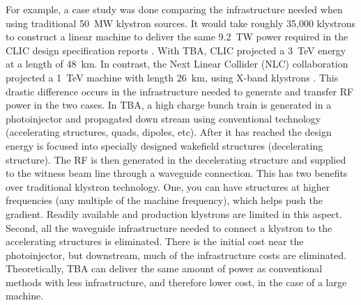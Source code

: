 For example, a case study was done comparing the infrastructure 
needed when using traditional \SI{50}{MW} klystron sources.
It would take roughly 35,000 klystrons to construct a linear machine to deliver the same 
\SI{9.2}{TW} power required in the CLIC design specification reports \cite{CLICdesignReport}. 
With TBA, CLIC projected a \SI{3}{TeV} energy at a length of \SI{48}{km}.
In contrast, the Next Linear Collider (NLC) collaboration projected a \SI{1}{TeV} machine 
with length \SI{26}{km}, using X-band klystrons \cite{NLC}. 
This drastic difference occurs in the infrastructure needed to generate and transfer
RF power in the two cases. In TBA, a high charge bunch train is generated in 
a photoinjector and propagated down stream using conventional technology 
(accelerating structures, quads, dipoles, etc). After it has reached the design energy
is focused into specially designed wakefield structures (decelerating structure).
The RF is then generated in the decelerating structure and supplied to the witness 
beam line through a waveguide connection. This has two benefits over traditional klystron technology.
One, you can have structures at higher frequencies (any multiple of the machine frequency), 
which helps push the gradient. Readily available and production klystrons are limited in this aspect.
Second, all the waveguide infrastructure needed to connect a klystron to the accelerating 
structures is eliminated. There is the initial cost near the photoinjector, 
but downstream, much of the infrastructure costs are eliminated.
Theoretically, TBA can deliver the same amount of power as conventional methods with less 
infrastructure, and therefore lower cost, in the case of a large machine. 

